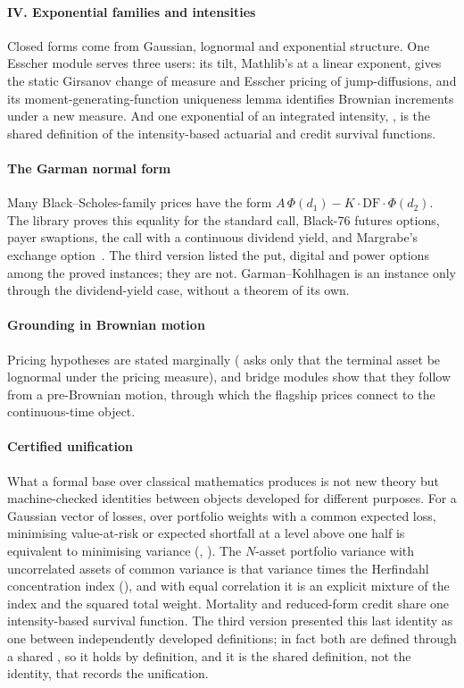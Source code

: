 \documentclass[11pt]{article}
\begin{document}
\paragraph{IV. Exponential families and intensities}
Closed forms come from Gaussian, lognormal and exponential structure. One Esscher module serves three users: its tilt,
Mathlib's  at a linear exponent, gives the static Girsanov change of measure and Esscher pricing of
jump-diffusions, and its moment-generating-function uniqueness lemma identifies Brownian increments under a new measure.
And one exponential of an integrated intensity, , is the shared definition of the
intensity-based actuarial and credit survival functions.

\paragraph{The Garman normal form}
Many Black--Scholes-family prices have the form $A\,\Phi(d_1)-K\cdot\mathrm{DF}\cdot\Phi(d_2)$. The library proves this
equality for the standard call, Black-76 futures options, payer swaptions, the call with a continuous dividend yield, and
Margrabe's exchange option~\cite{Margrabe1978}. The third version listed the put,
digital and power options among the proved instances; they are not. Garman--Kohlhagen is an instance only through the
dividend-yield case, without a theorem of its own.

\paragraph{Grounding in Brownian motion}
Pricing hypotheses are stated marginally ( asks only that the terminal asset be lognormal under the pricing
measure), and bridge modules show that they follow from a pre-Brownian motion, through which the flagship prices connect
to the continuous-time object.

\paragraph{Certified unification}
What a formal base over classical mathematics produces is not new theory but machine-checked identities between objects
developed for different purposes. For a Gaussian vector of losses, over portfolio weights with a common expected loss, minimising value-at-risk or
expected shortfall at a level above one half is equivalent to minimising variance
(, ). The
$N$-asset portfolio variance with uncorrelated assets of common variance is that variance times the Herfindahl concentration
index (), and with equal correlation it is an explicit mixture of the index and the
squared total weight. Mortality and reduced-form credit share one intensity-based survival function. The third version presented this last identity
as one between independently developed definitions; in fact both are defined through a shared
, so it holds by definition, and it is the shared definition, not the identity, that records the
unification.
\end{document}
